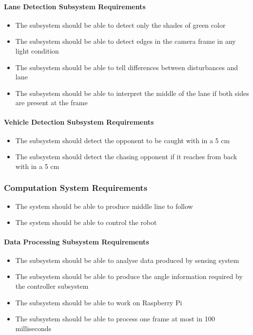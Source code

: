 \documentclass[a4paper,12pt]{article}
\begin{document}
	\paragraph{Lane Detection Subsystem Requirements}	
		
		\begin{itemize}
			\item The subsystem should be able to detect only the shades of green color
			\item The subsystem should be able to detect edges in the camera frame in any light condition
			\item The subsystem should be able to tell differences between disturbances and lane
			\item The subsystem should be able to interpret the middle of the lane if both sides are present at the frame
		\end{itemize}
	 
	 
	\paragraph{Vehicle Detection Subsystem Requirements}
	
		\begin{itemize}
			\item The subsystem should detect the opponent to be caught with in a 5 cm 
			\item The subsystem should detect the chasing opponent if it reaches from back with in a 5 cm  
		\end{itemize}
		
		
	\subsubsection{Computation System Requirements}
		
		\begin{itemize}
			\item The system should	be able to produce middle line to follow
			\item The system should be able to control the robot
		\end{itemize}			
	
	
	\paragraph{Data Processing Subsystem Requirements}	
	
		\begin{itemize}
			\item The subsystem should be able to analyse data produced by sensing system
			\item The subsystem should be able to produce the angle information required by the controller subsystem
			\item The subsystem should be able to work on Raspberry Pi
			\item The subsystem should be able to process one frame at most in 100 milliseconds
		\end{itemize}
		
\end{document}

